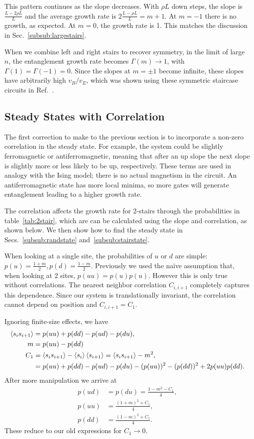 This pattern continues as the slope decreases. With $\rho L$ down steps, the slope is $\frac{L-2\rho L}{L}$ and the average growth rate is $2\frac{L-\rho L}{L} = m+1$. At $m = -1$ there is no growth, as expected. At $m=0$, the growth rate is 1. This matches the discussion in Sec.~\ref{subsub:largestairs}.

When we combine left and right stairs to recover symmetry, in the limit of large $n$, the entanglement growth rate becomes $\Gamma(m)\to 1$, with $\Gamma(1) = \Gamma(-1)=0$. Since the slopes at $m=\pm1$ become infinite, these slopes have arbitrarily high $v_B/v_E$, which was shown using these symmetric staircase circuits in Ref.~\cite{Nahum2018}.

\subsection{Steady States with Correlation} \label{sub:steadystate}

The first correction to make to the previous section is to incorporate a non-zero correlation in the steady state. For example, the system could be slightly ferromagnetic or antiferromagnetic, meaning that after an up slope the next slope is slightly more or less likely to be up, respectively. These terms are used in analogy with the Ising model; there is no actual magnetism in the circuit. An antiferromagnetic state has more local minima, so more gates will generate entanglement leading to a higher growth rate.

The correlation affects the growth rate for 2-stairs through the probabilities in table~\ref{tab:2stair}, which are can be calculated using the slope and correlation, as shown below. We then show how to find the steady state in Secs.~\ref{subsub:randstate} and~\ref{subsub:stairstate}.

When looking at a single site, the probabilities of $u$ or $d$ are simple: $p(u) = \frac{1+m}{2}, p(d) = \frac{1-m}{2}$. Previously we used the na\"ive assumption that, when looking at 2 sites, $p(uu) = p(u)p(u)$. However this is only true without correlations. The nearest neighbor correlation $C_{i,i+1}$ completely captures this dependence. Since our system is translationally invariant, the correlation cannot depend on position and $C_{i,i+1}=C_1$.

Ignoring finite-size effects, we have
\begin{align}
\left\langle s_is_{i+1} \right\rangle &= p(uu) + p(dd) - p(ud) - p(du),\nonumber\\
m &= p(uu) - p(dd)\nonumber\\
C_{1} &= \left\langle s_is_{i+1} \right\rangle-\left\langle s_i \right\rangle\left\langle s_{i+1} \right\rangle = \left\langle s_is_{i+1} \right\rangle - m^2,\nonumber\\
&= p(uu) + p(dd) - p(ud) - p(du) - (p(uu))^2 - (p(dd))^2 + 2p(uu)p(dd).
\end{align}
After more manipulation we arrive at 
\begin{align}
p(ud) &= p(du) = \frac{1-m^2-C_1}{4},\\
p(uu) &= \frac{(1+m)^2+C_1}{4},\\
p(dd) &= \frac{(1-m)^2+C_1}{4}.
\end{align}
These reduce to our old expressions for $C_1\to0$.

